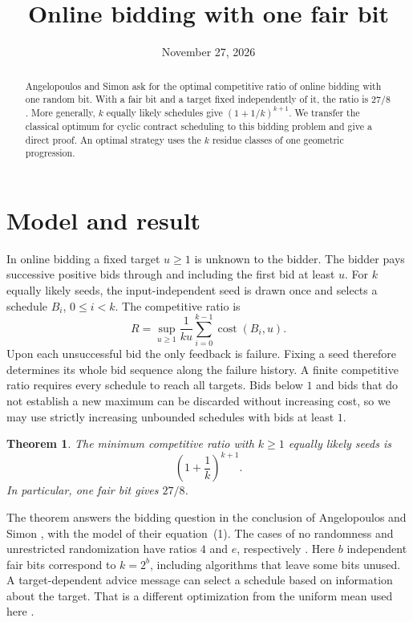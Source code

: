 \documentclass[11pt,a4paper]{amsart}
\title{Online bidding with one fair bit}
\date{November 27, 2026}
\newtheorem{theorem}{Theorem}
\begin{document}
\begin{abstract}
Angelopoulos and Simon ask for the optimal competitive ratio of online bidding with one random bit. With a fair bit and a target fixed independently of it, the ratio is \(27/8\). More generally, \(k\) equally likely schedules give \((1+1/k)^{k+1}\). We transfer the classical optimum for cyclic contract scheduling to this bidding problem and give a direct proof. An optimal strategy uses the \(k\) residue classes of one geometric progression.
\end{abstract}
\maketitle

\section{Model and result}

In online bidding a fixed target \(u\ge1\) is unknown to the bidder. The bidder pays successive positive bids through and including the first bid at least \(u\). For \(k\) equally likely seeds, the input-independent seed is drawn once and selects a schedule \(B_i\), \(0\le i<k\). The competitive ratio is
\[
 R=\sup_{u\ge1}\frac{1}{ku}\sum_{i=0}^{k-1}\operatorname{cost}(B_i,u).
\]
Upon each unsuccessful bid the only feedback is failure. Fixing a seed therefore determines its whole bid sequence along the failure history. A finite competitive ratio requires every schedule to reach all targets. Bids below \(1\) and bids that do not establish a new maximum can be discarded without increasing cost, so we may use strictly increasing unbounded schedules with bids at least \(1\).

\begin{theorem}\label{thm:main}
The minimum competitive ratio with \(k\ge1\) equally likely seeds is
\[
 \left(1+\frac1k\right)^{k+1}.
\]
In particular, one fair bit gives \(27/8\).
\end{theorem}

The theorem answers the bidding question in the conclusion of Angelopoulos and Simon \cite[\S6]{as}, with the model of their equation~(1). The cases of no randomness and unrestricted randomization have ratios \(4\) and \(e\), respectively \cite[Thms.~1--2]{ckny}. Here \(b\) independent fair bits correspond to \(k=2^b\), including algorithms that leave some bits unused. A target-dependent advice message can select a schedule based on information about the target. That is a different optimization from the uniform mean used here \cite{aak,abds}.
\end{document}
